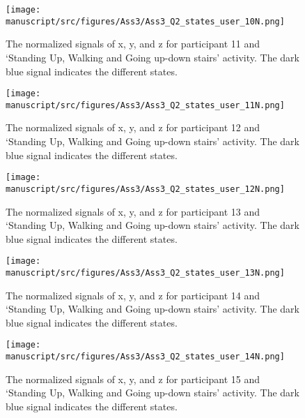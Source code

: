 \begin{figure}[H]
    \centering
    \begin{minipage}[b]{1\textwidth}
        \texttt{[image: manuscript/src/figures/Ass3/Ass3\_Q2\_states\_user\_10N.png]}
    \end{minipage}
    \caption{The normalized signals of x, y, and z for participant 11 and ‘Standing  Up,  Walking  and  Going  up-down  stairs’ activity. The dark blue signal indicates the different states.}
    \label{fig:Ass3_Q2_states_user_10N}
\end{figure}
\begin{figure}[H]
    \centering
    \begin{minipage}[b]{1\textwidth}
        \texttt{[image: manuscript/src/figures/Ass3/Ass3\_Q2\_states\_user\_11N.png]}
    \end{minipage}
    \caption{The normalized signals of x, y, and z for participant 12 and ‘Standing  Up,  Walking  and  Going  up-down  stairs’ activity. The dark blue signal indicates the different states.}
    \label{fig:Ass3_Q2_states_user_11N}
\end{figure}
\begin{figure}[H]
    \centering
    \begin{minipage}[b]{1\textwidth}
        \texttt{[image: manuscript/src/figures/Ass3/Ass3\_Q2\_states\_user\_12N.png]}
    \end{minipage}
    \caption{The normalized signals of x, y, and z for participant 13 and ‘Standing  Up,  Walking  and  Going  up-down  stairs’ activity. The dark blue signal indicates the different states.}
    \label{fig:Ass3_Q2_states_user_12N}
\end{figure}
\begin{figure}[H]
    \centering
    \begin{minipage}[b]{1\textwidth}
        \texttt{[image: manuscript/src/figures/Ass3/Ass3\_Q2\_states\_user\_13N.png]}
    \end{minipage}
    \caption{The normalized signals of x, y, and z for participant 14 and ‘Standing  Up,  Walking  and  Going  up-down  stairs’ activity. The dark blue signal indicates the different states.}
    \label{fig:Ass3_Q2_states_user_13N}
\end{figure}
\begin{figure}[H]
    \centering
    \begin{minipage}[b]{1\textwidth}
        \texttt{[image: manuscript/src/figures/Ass3/Ass3\_Q2\_states\_user\_14N.png]}
    \end{minipage}
    \caption{The normalized signals of x, y, and z for participant 15 and ‘Standing  Up,  Walking  and  Going  up-down  stairs’ activity. The dark blue signal indicates the different states.}
    \label{fig:Ass3_Q2_states_user_14N}
\end{figure}


